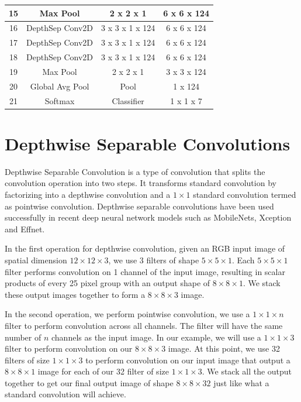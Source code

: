 \documentclass[master]{thesis-uestc}
\begin{document}
\begin{table}[ht]
\begin{center}
\begin{tabular}{|c|c|c|c|}
15 & Max Pool & 2 x 2 x 1 & 6 x 6 x 124\\ \hline

16 & DepthSep Conv2D & 3 x 3 x 1 x 124 & 6 x 6 x 124\\ \hline
17 & DepthSep Conv2D & 3 x 3 x 1 x 124 & 6 x 6 x 124\\ \hline
18 & DepthSep Conv2D & 3 x 3 x 1 x 124 & 6 x 6 x 124\\ \hline

19 & Max Pool & 2 x 2 x 1 & 3 x 3 x 124\\ \hline

20 & Global Avg Pool & Pool & 1 x 124\\ \hline
21 & Softmax & Classifier & 1 x 1 x 7\\ \hline

\end{tabular}
\end{center}
\end{table}

\section{Depthwise Separable Convolutions}\label{depthconve}
Depthwise Separable Convolution is a type of convolution that splits the convolution operation into two steps. It transforms standard convolution by factorizing into a depthwise convolution and a $1 \times 1$ standard convolution termed as pointwise convolution. Depthwise separable convolutions have been used successfully in recent deep neural network models such as MobileNets, Xception and Effnet.

In the first operation for depthwise convolution, given an RGB input image of spatial dimension $12 \times 12 \times 3$, we use 3 filters of shape $5 \times 5\times 1$. Each $5 \times 5\times 1$ filter performs convolution on 1 channel of the input image, resulting in scalar products of every 25 pixel group with an output shape of $8\times8\times1$. We stack these output images together to form a $8\times8\times3$ image.

In the second operation, we perform pointwise convolution, we use a $1\times1\times n$ filter to perform convolution across all channels. The filter will have the same number of $n$ channels as the input image. In our example, we will use a $1\times1\times3$ filter to perform convolution on our $8\times8\times3$ image. At this point, we use 32 filters of size $1\times1\times3$ to perform convolution on our input image that output a $8\times8\times1$ image for each of our 32 filter of size $1\times1\times3$. We stack all the output together to get our final output image of shape $8\times8\times32$ just like what a standard convolution will achieve.
\end{document}
